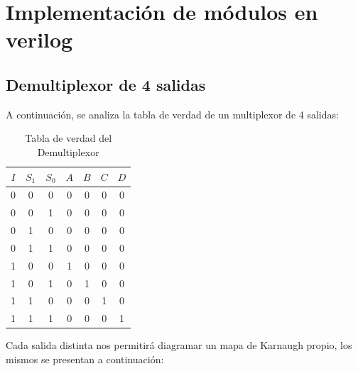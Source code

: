 \section{Implementación de módulos en verilog}
\subsection{Demultiplexor de 4 salidas}

A continuación, se analiza la tabla de verdad de un multiplexor de 4 salidas:

\begin{table}[H]
	\begin{center}
		\begin{tabular}{|c|c|c||c|c|c|c|}
			\hline
			$I$ &	$S_1$ &	$S_0$ &	$A$ & $B$ & $C$ &$D$ \\
			\hline
            0 & 0 & 0 & 0 & 0 & 0 & 0 \\
            \hline          
            0 & 0 & 1 & 0 & 0 & 0 & 0 \\
            \hline
            
            0 & 1 & 0 & 0 & 0 & 0 & 0 \\
            \hline
            
            0 & 1 & 1 & 0 & 0 & 0 & 0 \\
            \hline
            
            1 & 0 & 0 & 1 & 0 & 0 & 0 \\
            \hline
            
            1 & 0 & 1 & 0 & 1 & 0 & 0 \\
            \hline
            
            1 & 1 & 0 & 0 & 0 & 1 & 0 \\
            \hline
            
            1 & 1 & 1 & 0 & 0 & 0 & 1\\
            \hline
			
		\end{tabular}
		\caption{Tabla de verdad del Demultiplexor}
	\end{center}

\end{table}
Cada salida distinta nos permitirá diagramar un mapa de Karnaugh propio, los mismos se presentan a continuación:

